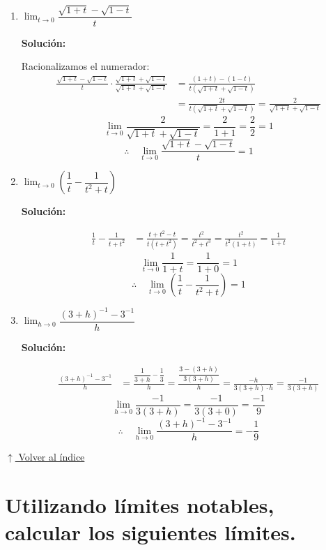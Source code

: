 \documentclass[12pt]{article}
\newcommand{\solucion}{%
    \vspace{0.8em}%
    \textbf{Solución:}%
}
\newcommand{\volverindice}{%
    \vspace{1em}%
    \begin{flushright}%
        \hyperlink{indice}{\small $\uparrow$ Volver al índice}%
    \end{flushright}%
}
\begin{document}
\begin{enumerate}[label=\alph*)]
    \item $\lim_{t \to 0} \dfrac{\sqrt{1 + t} - \sqrt{1 - t}}{t}$

    \solucion

    Racionalizamos el numerador:
    \begin{align*}
        \frac{\sqrt{1+t}-\sqrt{1-t}}{t} \cdot \frac{\sqrt{1+t}+\sqrt{1-t}}{\sqrt{1+t}+\sqrt{1-t}}
        &= \frac{(1+t)-(1-t)}{t\!\left(\sqrt{1+t}+\sqrt{1-t}\right)} \\
        &= \frac{2t}{t\!\left(\sqrt{1+t}+\sqrt{1-t}\right)}
        = \frac{2}{\sqrt{1+t}+\sqrt{1-t}}
    \end{align*}
    \[
        \lim_{t\to0}\frac{2}{\sqrt{1+t}+\sqrt{1-t}} = \frac{2}{1+1} = \frac{2}{2} = 1
    \]
    \[
        \therefore\quad \lim_{t\to0}\frac{\sqrt{1+t}-\sqrt{1-t}}{t} = 1
    \]

    \item $\lim_{t \to 0} \left(\dfrac{1}{t} - \dfrac{1}{t^2 + t}\right)$

    \solucion
    \begin{align*}
        \frac{1}{t} - \frac{1}{t+t^2}
        &= \frac{t+t^2-t}{t(t+t^2)}
        = \frac{t^2}{t^2+t^3}
        = \frac{t^2}{t^2(1+t)}
        = \frac{1}{1+t}
    \end{align*}
    \[
        \lim_{t\to0}\frac{1}{1+t} = \frac{1}{1+0} = 1
    \]
    \[
        \therefore\quad \lim_{t\to0}\left(\frac{1}{t}-\frac{1}{t^2+t}\right) = 1
    \]

    \item $\lim_{h \to 0} \dfrac{(3 + h)^{-1} - 3^{-1}}{h}$

    \solucion
    \begin{align*}
        \frac{(3+h)^{-1}-3^{-1}}{h}
        &= \frac{\dfrac{1}{3+h}-\dfrac{1}{3}}{h}
        = \frac{\dfrac{3-(3+h)}{3(3+h)}}{h}
        = \frac{-h}{3(3+h)\cdot h}
        = \frac{-1}{3(3+h)}
    \end{align*}
    \[
        \lim_{h\to0}\frac{-1}{3(3+h)} = \frac{-1}{3(3+0)} = \frac{-1}{9}
    \]
    \[
        \therefore\quad \lim_{h\to0}\frac{(3+h)^{-1}-3^{-1}}{h} = -\frac{1}{9}
    \]
\end{enumerate}

\volverindice
\newpage

\section[Límites notables]{Utilizando límites notables, calcular los siguientes límites.}
\end{document}
